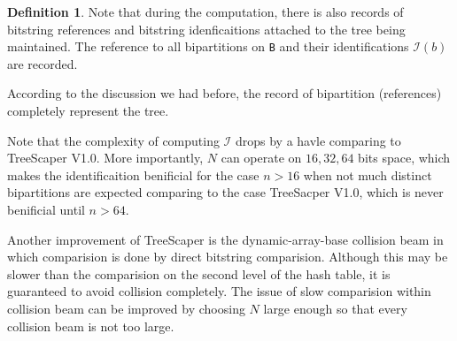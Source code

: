 \documentclass[11pt]{article}
\theoremstyle{definition}
\newtheorem{defn}{Definition}[section]
\theoremstyle{remark}
\theoremstyle{plain}
\begin{document}
\begin{defn}
	Note that during the computation, there is also records of bitstring references and bitstring idenficaitions attached to the tree being maintained. The reference to all bipartitions on \texttt{B} and their identifications $\mathcal{I}(b)$ are recorded.
\end{defn}

According to the discussion we had before, the record of bipartition (references) completely represent the tree.


Note that the complexity of computing $\mathcal{I}$ drops by a havle comparing to TreeScaper V1.0. More importantly, $N$ can operate on $16,32, 64$ bits space, which makes the identificaition benificial for the case $n>16$ when not much distinct bipartitions are expected comparing to the case TreeSacper V1.0, which is never benificial until $n>64$. 

Another improvement of TreeScaper is the dynamic-array-base collision beam in which comparision is done by direct bitstring comparision. Although this may be slower than the comparision on the second level of the hash table, it is guaranteed to avoid collision completely. The issue of slow comparision within collision beam can be improved by choosing $N$ large enough so that every collision beam is not too large.




\newpage
\end{document}
